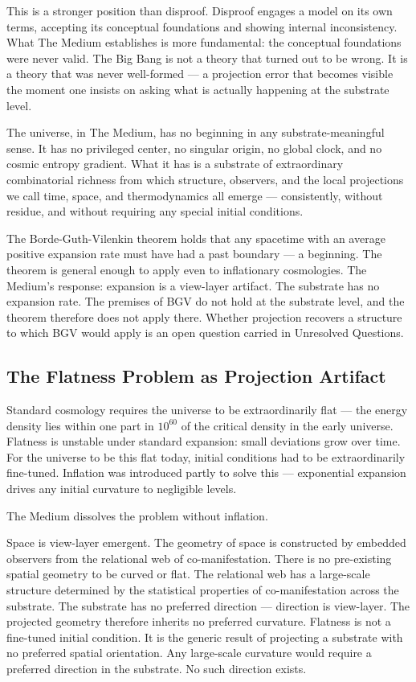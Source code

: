 \documentclass[11pt,letterpaper]{article}
\begin{document}
This is a stronger position than disproof. Disproof engages a model on its own terms, accepting its conceptual foundations and showing internal inconsistency. What The Medium establishes is more fundamental: the conceptual foundations were never valid. The Big Bang is not a theory that turned out to be wrong. It is a theory that was never well-formed --- a projection error that becomes visible the moment one insists on asking what is actually happening at the substrate level.

The universe, in The Medium, has no beginning in any substrate-meaningful sense. It has no privileged center, no singular origin, no global clock, and no cosmic entropy gradient. What it has is a substrate of extraordinary combinatorial richness from which structure, observers, and the local projections we call time, space, and thermodynamics all emerge --- consistently, without residue, and without requiring any special initial conditions.

The Borde-Guth-Vilenkin theorem holds that any spacetime with an average positive expansion rate must have had a past boundary --- a beginning. The theorem is general enough to apply even to inflationary cosmologies. The Medium's response: expansion is a view-layer artifact. The substrate has no expansion rate. The premises of BGV do not hold at the substrate level, and the theorem therefore does not apply there. Whether projection recovers a structure to which BGV would apply is an open question carried in Unresolved Questions.

\subsection{The Flatness Problem as Projection Artifact}
\label{sec:org2ad7242}

Standard cosmology requires the universe to be extraordinarily flat --- the energy density lies within one part in \(10^{60}\) of the critical density in the early universe. Flatness is unstable under standard expansion: small deviations grow over time. For the universe to be this flat today, initial conditions had to be extraordinarily fine-tuned. Inflation was introduced partly to solve this --- exponential expansion drives any initial curvature to negligible levels.

The Medium dissolves the problem without inflation.

Space is view-layer emergent. The geometry of space is constructed by embedded observers from the relational web of co-manifestation. There is no pre-existing spatial geometry to be curved or flat. The relational web has a large-scale structure determined by the statistical properties of co-manifestation across the substrate. The substrate has no preferred direction --- direction is view-layer. The projected geometry therefore inherits no preferred curvature. Flatness is not a fine-tuned initial condition. It is the generic result of projecting a substrate with no preferred spatial orientation. Any large-scale curvature would require a preferred direction in the substrate. No such direction exists.
\end{document}
